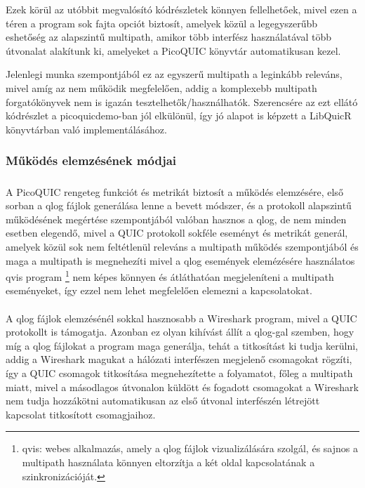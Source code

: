 \documentclass[a4paper,oneside]{article}
\begin{document}
Ezek körül az utóbbit megvalósító kódrészletek könnyen fellelhetőek, mivel ezen a téren a program sok fajta opciót biztosít, 
amelyek közül a legegyszerűbb eshetőség az alapszintű multipath, amikor több interfész használatával
több útvonalat alakítunk ki, amelyeket a PicoQUIC könyvtár automatikusan kezel.

Jelenlegi munka szempontjából ez az egyszerű multipath a leginkább releváns,
mivel amíg az nem működik megfelelően, addig a komplexebb multipath forgatókönyvek nem is igazán tesztelhetők/használhatók.
Szerencsére az ezt ellátó kódrészlet a picoquicdemo-ban jól elkülönül, így jó alapot is képzett
a LibQuicR könyvtárban való implementálásához.

\subsubsection{Működés elemzésének módjai}

\subparagraph{}

A PicoQUIC rengeteg funkciót és metrikát biztosít a működés elemzésére, 
első sorban a qlog fájlok generálása lenne a bevett módszer, és
a protokoll alapszintű működésének megértése szempontjából valóban hasznos 
a qlog, de nem minden esetben elegendő, mivel a QUIC protokoll
sokféle eseményt és metrikát generál, amelyek közül sok nem feltétlenül releváns a 
multipath működés szempontjából és maga a multipath is megnehezíti mivel a qlog események elemézésére használatos qvis program\cite{qvis} \footnote{qvis: webes alkalmazás, amely a qlog 
fájlok vizualizálására szolgál, és sajnos a multipath használata könnyen eltorzítja a két oldal 
kapcsolatának a szinkronizációját.} nem képes könnyen és átláthatóan megjeleníteni a multipath eseményeket, 
így ezzel nem lehet megfelelően elemezni a kapcsolatokat.

\paragraph{}
A qlog fájlok elemzésénél sokkal hasznosabb a Wireshark program, mivel
a QUIC protokollt is támogatja.
Azonban ez olyan kihívást állít a qlog-gal szemben, hogy míg a 
qlog fájlokat a program maga generálja, tehát a titkosítást ki tudja kerülni, 
addig a Wireshark magukat a hálózati interfészen megjelenő csomagokat rögzíti, 
így a QUIC csomagok titkosítása megnehezítette a folyamatot, főleg a multipath 
miatt, mivel a másodlagos útvonalon küldött és fogadott csomagokat a Wireshark 
nem tudja hozzákötni automatikusan az első útvonal interfészén létrejött kapcsolat titkosított csomagjaihoz.
\end{document}
